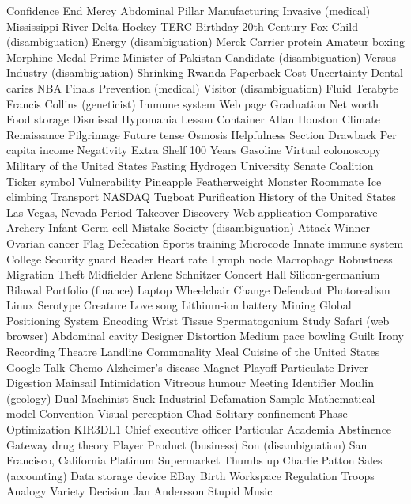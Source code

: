 Confidence  End  Mercy  
Abdominal  Pillar  Manufacturing  
Invasive (medical)  Mississippi River Delta  Hockey  
TERC  Birthday  20th Century Fox  
Child (disambiguation)  Energy (disambiguation)  Merck  
Carrier protein  Amateur boxing  Morphine  
Medal  Prime Minister of Pakistan  Candidate (disambiguation)  
Versus  Industry (disambiguation)  Shrinking  
Rwanda  Paperback  Cost  
Uncertainty  Dental caries  NBA Finals  
Prevention (medical)  Visitor (disambiguation)  Fluid  
Terabyte  Francis Collins (geneticist)  Immune system  
Web page  Graduation  Net worth  
Food storage  Dismissal  Hypomania  
Lesson  Container  Allan Houston  
Climate  Renaissance  Pilgrimage  
Future tense  Osmosis  Helpfulness  
Section  Drawback  Per capita income  
Negativity  Extra  Shelf  
100 Years  Gasoline  Virtual colonoscopy  
Military of the United States  Fasting  Hydrogen  
University  Senate  Coalition  
Ticker symbol  Vulnerability  Pineapple  
Featherweight  Monster  Roommate  
Ice climbing  Transport  NASDAQ  
Tugboat  Purification  History of the United States  
Las Vegas, Nevada  Period  Takeover  
Discovery  Web application  Comparative  
Archery  Infant  Germ cell  
Mistake  Society (disambiguation)  Attack  
Winner  Ovarian cancer  Flag  
Defecation  Sports training  Microcode  
Innate immune system  College  Security guard  
Reader  Heart rate  Lymph node  
Macrophage  Robustness  Migration  
Theft  Midfielder  Arlene Schnitzer Concert Hall  
Silicon-germanium  Bilawal  Portfolio (finance)  
Laptop  Wheelchair  Change  
Defendant  Photorealism  Linux  
Serotype  Creature  Love song  
Lithium-ion battery  Mining  Global Positioning System  
Encoding  Wrist  Tissue  
Spermatogonium  Study  Safari (web browser)  
Abdominal cavity  Designer  Distortion  
Medium pace bowling  Guilt  Irony  
Recording  Theatre  Landline  
Commonality  Meal  Cuisine of the United States  
Google Talk  Chemo  Alzheimer's disease  
Magnet  Playoff  Particulate  
Driver  Digestion  Mainsail  
Intimidation  Vitreous humour  Meeting  
Identifier  Moulin (geology)  Dual  
Machinist  Suck  Industrial  
Defamation  Sample  Mathematical model  
Convention  Visual perception  Chad  
Solitary confinement  Phase  Optimization  
KIR3DL1  Chief executive officer  Particular  
Academia  Abstinence  Gateway drug theory  
Player  Product (business)  Son (disambiguation)  
San Francisco, California  Platinum  Supermarket  
Thumbs up  Charlie Patton  Sales (accounting)  
Data storage device  EBay  Birth  
Workspace  Regulation  Troops  
Analogy  Variety  Decision  
Jan Andersson  Stupid  Music  
